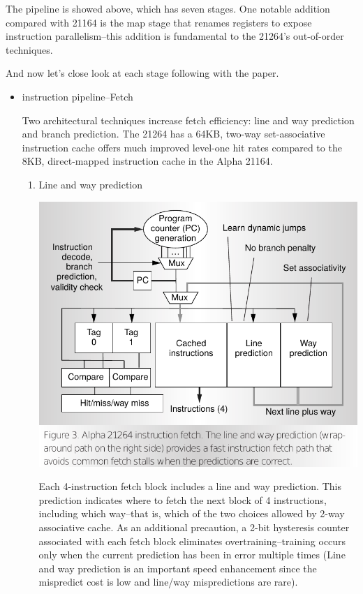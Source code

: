 \documentclass[11pt]{article}
\newcommand{\note}[1]{\scriptsize{#1}\normalsize}
\begin{document}
The pipeline is showed above, which has seven stages. One notable addition compared with 21164 is the map stage that renames registers to expose instruction parallelism--this addition is fundamental to the 21264's out-of-order techniques.

And now let's close look at each stage following with the paper.
\begin{itemize}
	\item instruction pipeline--Fetch
	
	Two architectural techniques increase fetch efficiency: line and way prediction and branch prediction. The 21264 has a 64KB, two-way set-associative instruction cache offers much improved level-one hit rates compared to the 8KB, direct-mapped instruction cache in the Alpha 21164.
	\begin{enumerate}
		\item Line and way prediction
		\begin{center}
			\includegraphics[scale=0.35]{fetch.png}
		\end{center}
		Each 4-instruction fetch block includes a line and way prediction. This prediction indicates where to fetch the next block of 4 instructions, including which way--that is, which of the two choices allowed by 2-way associative cache. As an additional precaution, a 2-bit hysteresis counter associated with each fetch block eliminates overtraining--training occurs only when the current prediction has been in error multiple times (\note{Line and way prediction is an important speed enhancement since the mispredict cost is low and line/way mispredictions are rare}).
		

\end{enumerate}
\end{itemize}
\end{document}
